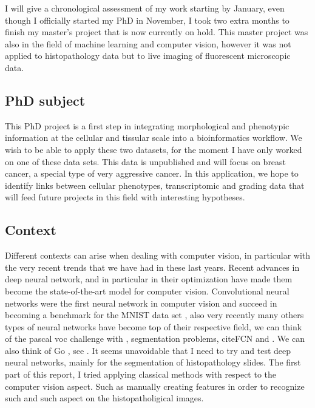 \documentclass[a4paper,10pt]{article}
\begin{document}
 I will give a chronological assessment of my work starting by January, even though I officially started my PhD in November, I took two extra months to finish my master's project that is now currently on hold. This master project was also in the field of machine learning and computer vision, however it was not applied to histopathology data but to live imaging of fluorescent microscopic data. 


\subsection*{PhD subject}

This  PhD  project is a first step in integrating morphological and phenotypic information at the cellular and tissular scale into a bioinformatics workflow. We wish to be able to apply these two datasets, for the moment I have only worked on one of these data sets. This data is unpublished and will focus on breast cancer, a special type of very aggressive cancer. In this application, we hope to identify links between cellular phenotypes, transcriptomic and grading data that will feed future projects in this field with interesting hypotheses. 

\subsection*{Context}

Different contexts can arise when dealing with computer vision, in particular with the very recent trends that we have had in these last years. Recent advances in deep neural network, and in particular in their optimization have made them become the state-of-the-art model for computer vision. Convolutional neural networks were the first neural network in computer vision and succeed in becoming a benchmark for the MNIST data set \cite{lecun}, also very recently many others types of neural networks have become top of their respective field, we can think of the pascal voc challenge with \cite{ImageNet}, segmentation problems, cite{FCN} and \cite{UNet}. We can also think of Go 
, see \cite{AlphaGo}. It seems unavoidable that I need to try and test deep neural networks, mainly for the segmentation of histopathology slides. The first part of this report, I tried applying classical methods with respect to the computer vision aspect. Such as manually creating features in order to recognize such and such aspect on the histopatholigical images.
\end{document}
